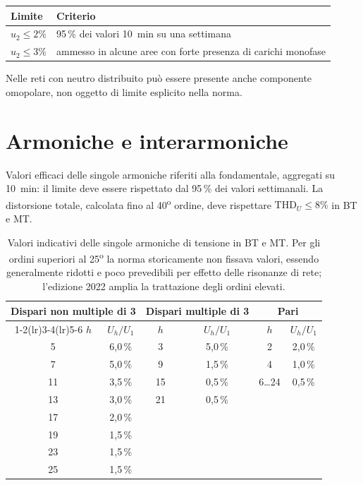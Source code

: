 \documentclass[11pt,a4paper]{article}
\begin{document}
\begin{center}
\begin{tabular}{ll}
\toprule
\textbf{Limite} & \textbf{Criterio} \\
\midrule
$u_2 \le 2\%$ & 95\,\% dei valori \SI{10}{\minute} su una settimana \\
$u_2 \le 3\%$ & ammesso in alcune aree con forte presenza di carichi monofase \\
\bottomrule
\end{tabular}
\end{center}

\noindent
Nelle reti con neutro distribuito può essere presente anche componente omopolare,
non oggetto di limite esplicito nella norma.

\section{Armoniche e interarmoniche}

Valori efficaci delle singole armoniche riferiti alla fondamentale, aggregati su
\SI{10}{\minute}: il limite deve essere rispettato dal 95\,\% dei valori settimanali.
La distorsione totale, calcolata fino al 40\textsuperscript{o} ordine, deve rispettare
$\mathrm{THD}_U \le 8\%$ in BT e MT.

\begin{table}[h]
\centering
\small
\begin{tabular}{cc cc cc}
\toprule
\multicolumn{2}{c}{\textbf{Dispari non multiple di 3}} &
\multicolumn{2}{c}{\textbf{Dispari multiple di 3}} &
\multicolumn{2}{c}{\textbf{Pari}} \\
\cmidrule(lr){1-2}\cmidrule(lr){3-4}\cmidrule(lr){5-6}
$h$ & $U_h/U_1$ & $h$ & $U_h/U_1$ & $h$ & $U_h/U_1$ \\
\midrule
5  & 6,0\,\%  & 3  & 5,0\,\%  & 2         & 2,0\,\% \\
7  & 5,0\,\%  & 9  & 1,5\,\%  & 4         & 1,0\,\% \\
11 & 3,5\,\%  & 15 & 0,5\,\%  & 6\dots24  & 0,5\,\% \\
13 & 3,0\,\%  & 21 & 0,5\,\%  &           &         \\
17 & 2,0\,\%  &    &          &           &         \\
19 & 1,5\,\%  &    &          &           &         \\
23 & 1,5\,\%  &    &          &           &         \\
25 & 1,5\,\%  &    &          &           &         \\
\bottomrule
\end{tabular}
\caption*{\small Valori indicativi delle singole armoniche di tensione in BT e MT.
Per gli ordini superiori al 25\textsuperscript{o} la norma storicamente non fissava
valori, essendo generalmente ridotti e poco prevedibili per effetto delle risonanze
di rete; l'edizione 2022 amplia la trattazione degli ordini elevati.}
\end{table}
\end{document}
